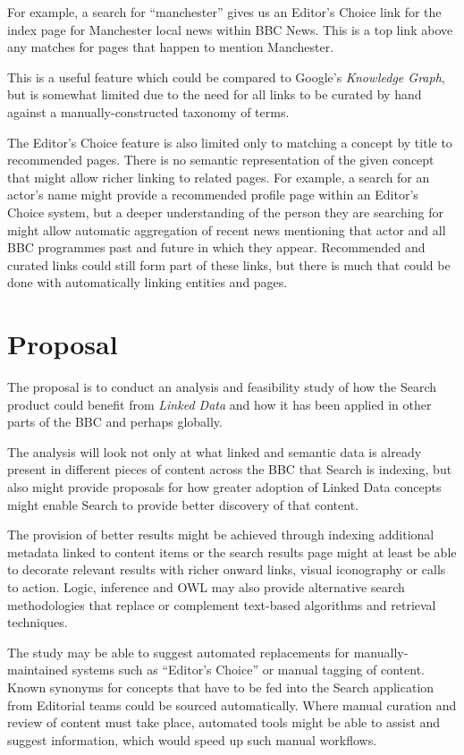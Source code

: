 \documentclass[10pt,a4paper]{article}
\begin{document}
For example, a search for ``manchester'' gives
us an Editor's Choice link for the index page for Manchester local
news within BBC News. This is a top link above any matches for pages
that happen to mention Manchester.

This is a useful feature which could be compared to Google's
\emph{Knowledge Graph}, but is somewhat limited due to the need for all links
to be curated by hand against a manually-constructed taxonomy of terms.

The Editor's Choice feature is also limited only to matching a
concept by title to recommended pages. There is no semantic
representation of the given concept that might allow richer linking
to related pages. For example, a search for an actor's name might
provide a recommended profile page within an Editor's Choice system,
but a deeper understanding of the person they are searching for might
allow automatic aggregation of recent news mentioning that actor and
all BBC programmes past and future in which they appear. Recommended
and curated links could still form part of these links, but there
is much that could be done with automatically linking entities and pages.

\section{Proposal}

The proposal is to conduct an analysis and feasibility study of how
the Search product could benefit from \emph{Linked Data} and how
it has been applied in other parts of the BBC and perhaps globally.

The analysis will look not only at what linked and semantic data is already
present in different pieces of content across the BBC that Search is
indexing, but also might provide proposals for how greater adoption
of Linked Data concepts might enable Search to provide better discovery
of that content.

The provision of better results might be achieved through indexing additional
metadata linked to content items or the search results page might
at least be able to decorate relevant results with richer onward links,
visual iconography or calls to action. Logic, inference and OWL may also provide
alternative search methodologies that replace or complement text-based
algorithms and retrieval techniques.

The study may be able to suggest automated replacements for
manually-maintained systems such as ``Editor's Choice'' or manual
tagging of content. Known synonyms for concepts that have to be fed into
the Search application from Editorial teams could be sourced automatically.
Where manual curation and review of content must take place, automated
tools might be able to assist and suggest information, which would
speed up such manual workflows.
\end{document}
